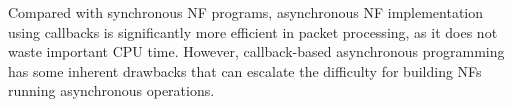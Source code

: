 

Compared with synchronous NF programs, asynchronous NF implementation using callbacks is significantly more efficient in packet processing, as it does not waste important CPU time. However, callback-based asynchronous programming has some inherent drawbacks that can escalate the difficulty for building NFs running asynchronous operations.

